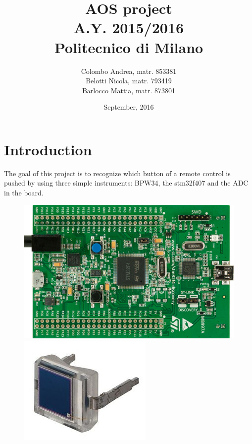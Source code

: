 \documentclass[18pt,oneside,a4paper, titlepage]{article}
\begin{document}
\title{\textbf{AOS project}\\ A.Y. 2015/2016\\
	Politecnico di Milano}	
\author{Colombo Andrea, matr. 853381\\Belotti Nicola, matr. 793419\\Barlocco Mattia, matr. 873801 }
\date{September, 2016}
\maketitle

\newpage
\tableofcontents

\newpage
\section{Introduction}
	The goal of this project is to recognize which button of a remote control is pushed by using three simple instruments: BPW34, the stm32f407 and the ADC in the board.
	\begin{figure}[h]
		\includegraphics[scale=0.3]{board.jpg}%
		\qquad\qquad
		\includegraphics[scale=0.3]{fotodiodo.jpg}
	\end{figure}
\newpage
\end{document}
